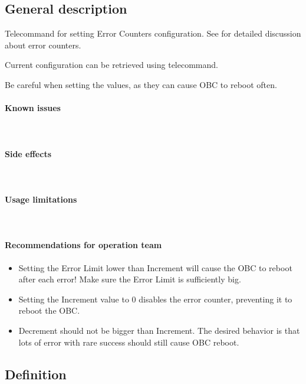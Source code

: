 

\subsection{General description}
Telecommand for setting Error Counters configuration. See  for detailed discussion about error counters. 

Current configuration can be retrieved using  telecommand.

\danger Be careful when setting the values, as they can cause OBC to reboot often.

\paragraph{Known issues} \mbox{} \\
\None

\paragraph{Side effects} \mbox{} \\
\None

\paragraph{Usage limitations} \mbox{} \\
\None

\paragraph{Recommendations for operation team} 
\begin{itemize}
	\item Setting the Error Limit lower than Increment will cause the OBC to reboot after each error! Make sure the Error Limit is sufficiently big.
	\item Setting the Increment value to 0 disables the error counter, preventing it to reboot the OBC.
	\item Decrement should not be bigger than Increment. The desired behavior is that lots of error with rare success should still cause OBC reboot. 
\end{itemize}

\subsection{Definition}

